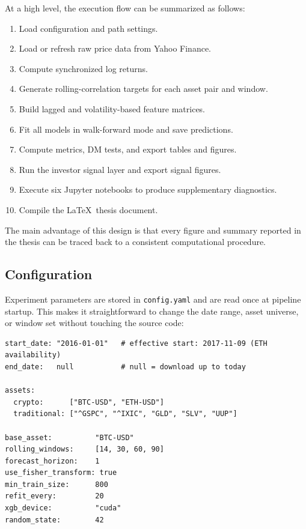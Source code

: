 At a high level, the execution flow can be summarized as follows:

\begin{enumerate}
    \item Load configuration and path settings.
    \item Load or refresh raw price data from Yahoo Finance.
    \item Compute synchronized log returns.
    \item Generate rolling-correlation targets for each asset pair and window.
    \item Build lagged and volatility-based feature matrices.
    \item Fit all models in walk-forward mode and save predictions.
    \item Compute metrics, DM tests, and export tables and figures.
    \item Run the investor signal layer and export signal figures.
    \item Execute six Jupyter notebooks to produce supplementary diagnostics.
    \item Compile the \LaTeX\ thesis document.
\end{enumerate}

The main advantage of this design is that every figure and summary reported in the thesis can be traced back to a consistent computational procedure.

\subsection{Configuration}

Experiment parameters are stored in \texttt{config.yaml} and are read once at pipeline startup. This makes it straightforward to change the date range, asset universe, or window set without touching the source code:

\begin{lstlisting}[language={}, caption={Excerpt from \texttt{config.yaml} showing key experiment parameters.}, label=lst:config]
start_date: "2016-01-01"   # effective start: 2017-11-09 (ETH availability)
end_date:   null           # null = download up to today

assets:
  crypto:      ["BTC-USD", "ETH-USD"]
  traditional: ["^GSPC", "^IXIC", "GLD", "SLV", "UUP"]

base_asset:          "BTC-USD"
rolling_windows:     [14, 30, 60, 90]
forecast_horizon:    1
use_fisher_transform: true
min_train_size:      800
refit_every:         20
xgb_device:          "cuda"
random_state:        42
\end{lstlisting}

